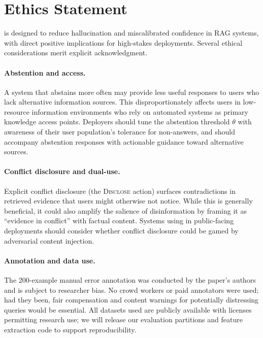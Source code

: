 \section{Ethics Statement}
\label{sec:ethics}

\method{} is designed to reduce hallucination and miscalibrated confidence in RAG systems, with direct positive implications for high-stakes deployments. Several ethical considerations merit explicit acknowledgment.

\paragraph{Abstention and access.}
A system that abstains more often may provide less useful responses to users who lack alternative information sources. This disproportionately affects users in low-resource information environments who rely on automated systems as primary knowledge access points. Deployers should tune the abstention threshold $\theta$ with awareness of their user population's tolerance for non-answers, and should accompany abstention responses with actionable guidance toward alternative sources.

\paragraph{Conflict disclosure and dual-use.}
Explicit conflict disclosure (the \textsc{Disclose} action) surfaces contradictions in retrieved evidence that users might otherwise not notice. While this is generally beneficial, it could also amplify the salience of disinformation by framing it as ``evidence in conflict'' with factual content. Systems using \method{} in public-facing deployments should consider whether conflict disclosure could be gamed by adversarial content injection.

\paragraph{Annotation and data use.}
The 200-example manual error annotation was conducted by the paper's authors and is subject to researcher bias. No crowd workers or paid annotators were used; had they been, fair compensation and content warnings for potentially distressing queries would be essential. All datasets used are publicly available with licenses permitting research use; we will release our evaluation partitions and feature extraction code to support reproducibility.
